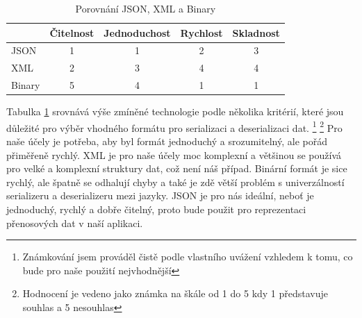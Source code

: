\begin{table}[h]
    \centering
    \begin{tabular}{|l|c|c|c|c|}
        \hline
               & Čitelnost & Jednoduchost & Rychlost & Skladnost \\
        \hline
        JSON   & 1         & 1            & 2        & 3         \\
        \hline
        XML    & 2         & 3            & 4        & 4         \\
        \hline
        Binary & 5         & 4            & 1        & 1         \\
        \hline
    \end{tabular}
    \caption{Porovnání JSON, XML a Binary }
    \label{tab:formats_comparison}
\end{table}

Tabulka \ref{tab:formats_comparison} srovnává výše zmíněné technologie podle několika kritérií, které jsou důležité pro výběr vhodného formátu pro serializaci a deserializaci dat. \footnote[1]{Známkování jsem prováděl čistě podle vlastního uvážení vzhledem k tomu, co bude pro naše použití nejvhodnější} \footnote[2]{Hodnocení je vedeno jako známka na škále od 1 do 5 kdy 1 představuje souhlas a 5 nesouhlas} Pro naše účely je potřeba, aby byl formát jednoduchý a srozumitelný, ale pořád přiměřeně rychlý. XML je pro naše účely moc komplexní a většinou se používá pro velké a komplexní struktury dat, což není náš případ. Binární formát je sice rychlý, ale špatně se odhalují chyby a také je zdě větší problém s univerzálností serializeru a deserializeru mezi jazyky. JSON je pro nás ideální, neboť je jednoduchý, rychlý a dobře čitelný, proto bude použit pro reprezentaci přenosových dat v naší aplikaci.


\endinput